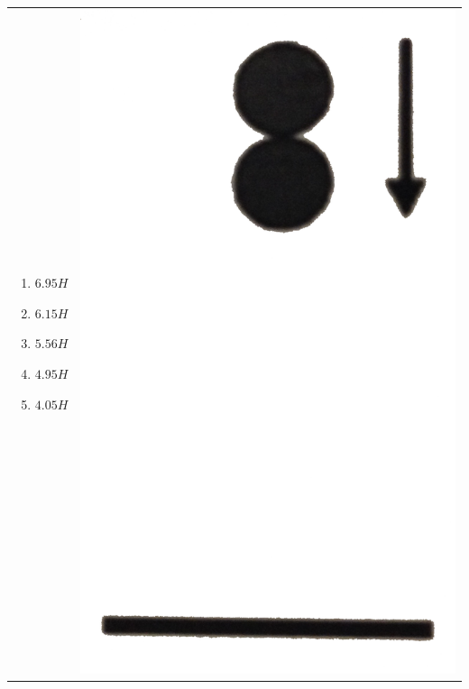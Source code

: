 \documentclass[12pt,letterpaper]{article}
\begin{document}
\begin{enumerate}[resume]
\begin{tabular}{l r}
\begin{minipage}{0.8\textwidth}
\begin{enumerate}
\item $6.95H$
\item $6.15H$
\item $5.56H$
\item $4.95H$
\item $4.05H$
\end{enumerate}
\end{minipage} &
\begin{minipage}{0.1\textwidth}
\includegraphics[width=\textwidth]{spheres.png}
\end{minipage}
\end{tabular}


\end{enumerate}
\end{document}
